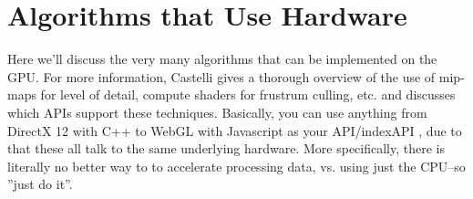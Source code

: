 \section{Algorithms that Use Hardware}
Here we'll discuss the very many algorithms that can be implemented on the GPU. For more information, Castelli
\cite{Castelli2018} gives a thorough overview of the use of mip-maps for level of detail, compute shaders for
frustrum culling, etc. and discusses which APIs support these techniques. Basically, you can use anything from
DirectX 12 with C++ to WebGL with Javascript as your API/index{API} ,
due to that these all talk to the same underlying hardware. More specifically, there is literally no better way to
to accelerate processing data, vs. using just the CPU--so ''just do it''.